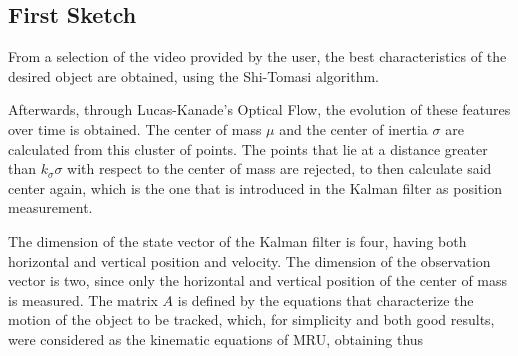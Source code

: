 
\subsection{First Sketch}

From a selection of the video provided by the user, the best characteristics of the desired object are obtained, using the Shi-Tomasi algorithm. 

Afterwards, through Lucas-Kanade's Optical Flow, the evolution of these features over time is obtained. The center of mass $\mu$ and the center of inertia $\sigma $ are calculated from this cluster of points. The points that lie at a distance greater than $k_{\sigma} \sigma$ with respect to the center of mass are rejected, to then calculate said center again, which is the one that is introduced in the Kalman filter as position measurement.

The dimension of the state vector of the Kalman filter is four, having both horizontal and vertical position and velocity. The dimension of the observation vector is two, since only the horizontal and vertical position of the center of mass is measured. The matrix $ A $ is defined by the equations that characterize the motion of the object to be tracked, which, for simplicity and both good results, were considered as the kinematic equations of MRU, obtaining thus


